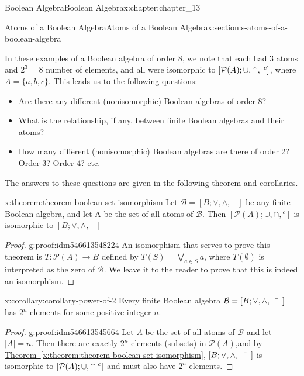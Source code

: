 \documentclass[oneside,10pt,]{book}
\newcommand{\xreffont}{\relax}
\numberwithin{equation}{section}
\begin{document}
\begin{chapterptx}{Boolean Algebra}{}{Boolean Algebra}{}{}{x:chapter:chapter_13}
\begin{sectionptx}{Atoms of a Boolean Algebra}{}{Atoms of a Boolean Algebra}{}{}{x:section:s-atoms-of-a-boolean-algebra}
\par
In these examples of a Boolean algebra of order 8, we note that each had 3 atoms and \(2^3 = 8\) number of elements, and all were isomorphic to \([\mathcal{P}(A ); \cup , \cap, \hspace{1 mm}^c]\), where \(A = \{a, b, c\}\). This leads us to the following questions:%
\begin{itemize}[label=\textbullet]
\item{}Are there any different (nonisomorphic) Boolean algebras of order 8?%
\item{}What is the relationship, if any, between finite Boolean algebras and their atoms?%
\item{}How many different (nonisomorphic) Boolean algebras are there of order 2? Order 3? Order 4? etc.%
\end{itemize}
%
\par
The answers to these questions are given in the following theorem and corollaries.%
\begin{theorem}{}{}{x:theorem:theorem-boolean-set-isomorphism}%
Let \(\mathcal{B}=[B; \lor, \land, -]\) be any finite Boolean algebra, and let A be the set of all atoms of \(\mathcal{B}\). Then \([\mathcal{P}(A); \cup, \cap, {}^c]\)  is isomorphic to \([B; \lor, \land, -]\)%
\end{theorem}
\begin{proof}{}{g:proof:idm546613548224}
An isomorphism that serves to prove this theorem is \(T:\mathcal{P}(A) \to B \) defined by \(T(S)= \bigvee_{a \in S}{a}\), where \(T(\emptyset)\) is interpreted as the zero of  \(\mathcal{B}\).  We leave it to the reader to prove that this is indeed an isomorphism.%
\end{proof}
\begin{corollary}{}{}{x:corollary:corollary-power-of-2}%
Every finite Boolean algebra \(\mathcal{B}=[B; \lor, \land, \bar{\hspace{5 mm}}]\) has \(2^n\)  elements for some positive integer \(n\).%
\end{corollary}
\begin{proof}{}{g:proof:idm546613545664}
Let \(A\) be the set of all atoms of \(\mathcal{B}\) and let \(\left| A\right|  = n\). Then there are exactly \(2^n\) elements (subsets) in \(\mathcal{P}(A)\),and by \hyperref[x:theorem:theorem-boolean-set-isomorphism]{Theorem~{\xreffont\ref{x:theorem:theorem-boolean-set-isomorphism}}}, \([B; \lor, \land, \bar{\hspace{5 mm}} ]\) is isomorphic to \([\mathcal{P}(A); \cup , \cap \hspace{1 mm}^c]\) and must also have \(2^n\) elements.%

\end{proof}
\end{sectionptx}
\end{chapterptx}
\end{document}

